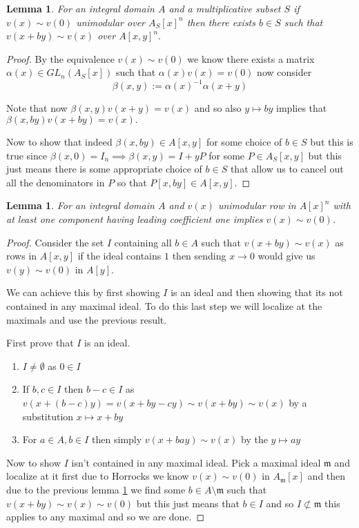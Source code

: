 \documentclass[12pt]{article}
\numberwithin{equation}{section}
\newcounter{dummy} \numberwithin{dummy}{section}
\newtheorem{lemma}[dummy]{Lemma}
\begin{document}
	\begin{lemma}\label{horrocksbutforlocal}
		For an integral domain $A$ and a multiplicative subset $S$ if $v(x) \sim v(0)$ unimodular over $A_S[x]^n $ then there exists $b \in S$ such that \\$v(x+by) \sim v(x) $ over $A[x,y]^n.$
	\end{lemma}
	\begin{proof}
		By the equivalence $v(x) \sim v(0)$ we know there exists a matrix $\alpha (x) \in GL_n(A_S[x])$ such that $\alpha(x)v(x)=v(0) $ now consider \[ \beta(x,y) := \alpha(x)^{-1} \alpha(x+y) \]
		
		Note that now $\beta(x,y)v(x+y)=v(x)$ and so also $y \mapsto by$ implies that $\beta(x,by)v(x+by)=v(x).$
		
		Now to show that indeed $\beta(x,by)\in A[x,y]$ for some choice of $b \in S$ but this is true since $\beta(x,0)=I_n \implies \beta(x,y)=I+yP $ for some $P \in A_S[x,y]$ but this just means there is some appropriate choice of $b \in S$ that allow us to cancel out all the denominators in $P$ so that $P[x,by] \in A[x,y]$.
	\end{proof}
	
	\begin{lemma}\label{horrocksbuteverything}
		For an integral domain $A$ and $v(x)$ unimodular row in $A[x]^n$ with at least one component having leading coefficient one implies $v(x) \sim v(0)$.
	\end{lemma}
	\begin{proof}
		Consider the set $I$ containing all $b \in A$ such that $v(x+by)\sim v(x)$ as rows in $A[x,y]$ if the ideal contains $1$ then sending $x \to 0$ would give us $v(y)\sim v(0) $ in $A[y].$
		
		We can achieve this by first showing $I$ is an ideal and then showing that its not contained in any maximal ideal.	To do this last step we will localize at the maximals and use the previous result.
		
		First prove that $I$ is an ideal.
		\begin{enumerate}
			\item $I \neq \emptyset $ as $0 \in I$
			\item If $b,c \in I$ then $b-c \in I$ as $v(x+(b-c)y)=v(x+by-cy) \sim v(x+by) \sim v(x)$ by a substitution $x \mapsto x+by$
			\item For $a \in A, b \in I$ then simply $v(x+bay) \sim v(x)$ by the $y \mapsto ay$
		\end{enumerate}
		
		Now to show $I$ isn't contained in any maximal ideal. Pick a maximal ideal $\mathfrak m$ and localize at it first due to Horrocks we know $v(x) \sim v(0) $ in $A_{\mathfrak m} [x]$ and then due to the previous lemma \ref{horrocksbutforlocal} we find some $b \in A\setminus \mathfrak m$ such that $v(x+by) \sim v(x) \sim v(0)$ but this just means that $ b \in I$ and so $I\not \subset \mathfrak m$ this applies to any maximal and so we are done.  
	\end{proof}
	
\end{document}
